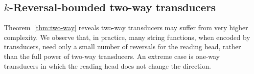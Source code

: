 




\subsection{$k$-Reversal-bounded two-way transducers} \label{subsec:krb}
 

Theorem~\ref{thm:two-way} reveals two-way transducers may suffer from very higher complexity. We observe that, in practice, many string functions, when encoded by transducers, need only a small number of reversals for the reading head, rather than the full power of two-way transducers. An extreme case is one-way transducers in which the reading head does not change the direction. 

